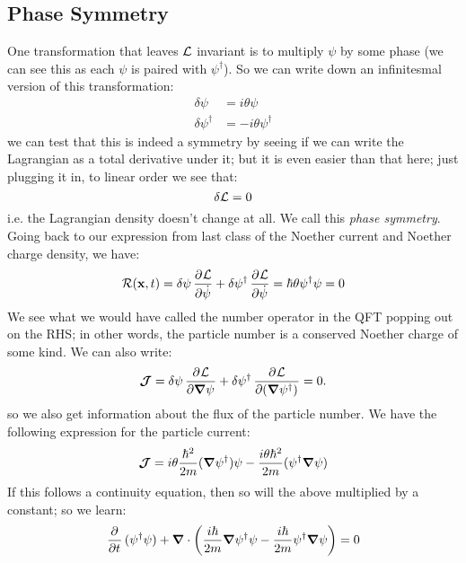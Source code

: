 \subsection{Phase Symmetry}
One transformation that leaves $\mathcal{L}$ invariant is to multiply $\psi$ by some phase (we can see this as each $\psi$ is paired with $\psi^\dag$). So we can write down an infinitesmal version of this transformation:
\begin{equation}
    \begin{split}
        \delta \psi &= i\theta\psi
        \\ \delta \psi^\dag &= -i\theta \psi^\dag
    \end{split}
\end{equation}
we can test that this is indeed a symmetry by seeing if we can write the Lagrangian as a total derivative under it; but it is even easier than that here; just plugging it in, to linear order we see that:
\begin{equation}
    \delta \mathcal{L} = 0
\end{equation}
i.e. the Lagrangian density doesn't change at all. We call this \emph{phase symmetry}. Going back to our expression from last class of the Noether current and Noether charge density, we have:
\begin{equation}
    \mathcal{R}(\v{x}, t) = \delta \psi \dpd{\L}{\dot{\psi}} + \delta \psi^\dag \dpd{\L}{\dot{\psi}} = \hbar \theta \psi^\dag \psi = 0
\end{equation} 
We see what we would have called the number operator in the QFT popping out on the RHS; in other words, the particle number is a conserved Noether charge of some kind. We can also write:
\begin{equation}
    \gv{\mathcal{J}} = \delta \psi \dpd{\L}{\nabla \psi} + \delta \psi^\dag \dpd{\L}{(\nabla \psi^\dag)} = 0.
\end{equation}
so we also get information about the flux of the particle number. We have the following expression for the particle current:
\begin{equation}
    \gv{\mathcal{J}} = i\theta\frac{\hbar^2}{2m}(\nabla \psi^\dag)\psi - \frac{i\theta\hbar^2}{2m}(\psi^\dag \nabla \psi)
\end{equation}
If this follows a continuity equation, then so will the above multiplied by a constant; so we learn:
\begin{equation}
    \dpd{}{t}(\psi^\dag\psi) + \nabla \cdot \left(\frac{i\hbar}{2m}\nabla \psi^\dag \psi - \frac{i\hbar}{2m}\psi^\dag \nabla \psi\right) = 0
\end{equation}
